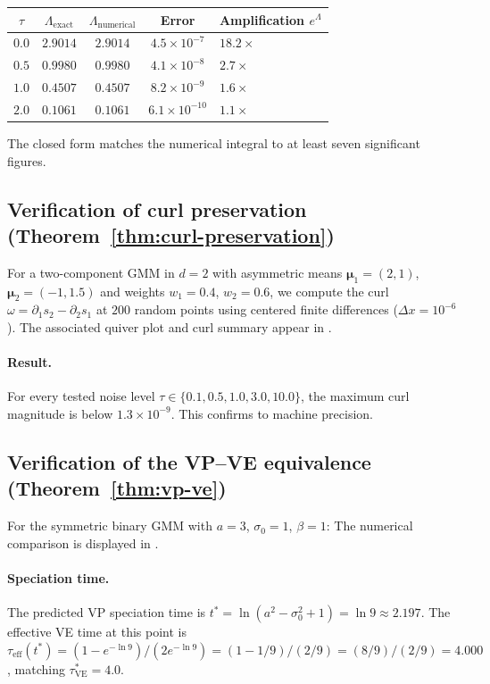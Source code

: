 \documentclass[11pt]{article}
\begin{document}
\begin{center}
\begin{tabular}{ccccl}
\toprule
$\tau$ & $\Lambda_{\text{exact}}$ & $\Lambda_{\text{numerical}}$ & Error & Amplification $e^\Lambda$ \\
\midrule
$0.0$ & $2.9014$ & $2.9014$ & $4.5 \times 10^{-7}$ & $18.2\times$ \\
$0.5$ & $0.9980$ & $0.9980$ & $4.1 \times 10^{-8}$ & $2.7\times$ \\
$1.0$ & $0.4507$ & $0.4507$ & $8.2 \times 10^{-9}$ & $1.6\times$ \\
$2.0$ & $0.1061$ & $0.1061$ & $6.1 \times 10^{-10}$ & $1.1\times$ \\
\bottomrule
\end{tabular}
\end{center}

The closed form matches the numerical integral to at least seven significant figures.

\subsection{Verification of curl preservation (Theorem~\ref{thm:curl-preservation})}\label{sec:exp:curl}

For a two-component GMM in $d = 2$ with asymmetric means $\bm{\mu}_1 = (2,1)$, $\bm{\mu}_2 = (-1, 1.5)$ and weights $w_1 = 0.4$, $w_2 = 0.6$, we compute the curl $\omega = \partial_1 s_2 - \partial_2 s_1$ at $200$ random points using centered finite differences ($\Delta x = 10^{-6}$).
The associated quiver plot and curl summary appear in .

\paragraph{Result.}
For every tested noise level $\tau \in \{0.1, 0.5, 1.0, 3.0, 10.0\}$, the maximum curl magnitude is below $1.3 \times 10^{-9}$.
This confirms  to machine precision.

\subsection{Verification of the VP--VE equivalence (Theorem~\ref{thm:vp-ve})}\label{sec:exp:vp}

For the symmetric binary GMM with $a = 3$, $\sigma_0 = 1$, $\beta = 1$:
The numerical comparison is displayed in .

\paragraph{Speciation time.}
The predicted VP speciation time is $t^\ast = \ln(a^2 - \sigma_0^2 + 1) = \ln 9 \approx 2.197$.
The effective VE time at this point is $\tau_{\mathrm{eff}}(t^\ast) = (1 - e^{-\ln 9})/(2e^{-\ln 9}) = (1 - 1/9)/(2/9) = (8/9)/(2/9) = 4.000$, matching $\tau^\ast_{\mathrm{VE}} = 4.0$.
\end{document}
